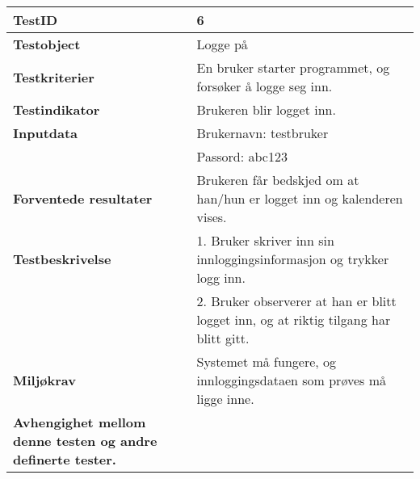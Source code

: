 	\begin{tabularx}{1.2\textwidth}{| p{5cm} | X |}
	\hline
	\textbf{TestID} 																& 6																	\\ \hline
	\textbf{Testobject} 															& Logge på															\\ \hline
	\textbf{Testkriterier} 															& En bruker starter programmet, og forsøker å logge seg inn.							\\ \hline
	\textbf{Testindikator} 															& Brukeren blir logget inn.													\\ \hline
	\textbf{Inputdata} 															& Brukernavn: testbruker													\\ 
																			& Passord: abc123														\\  \hline
	\textbf{Forventede resultater}									 				& Brukeren får bedskjed om at han/hun er logget inn og kalenderen vises.				\\ \hline
	\textbf{Testbeskrivelse} 														& 1. Bruker skriver inn sin innloggingsinformasjon og trykker logg inn.					\\
																			& 2. Bruker observerer at han er blitt logget inn, og at riktig tilgang har blitt gitt.					\\ \hline
	\textbf{Miljøkrav}			 												& Systemet må fungere, og innloggingsdataen som prøves må ligge inne.						\\ \hline
	\textbf{Avhengighet mellom denne testen og andre definerte tester.}		 				&				 													\\ \hline
	\end{tabularx}

\mbox{}\\

